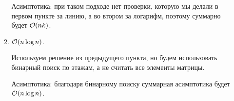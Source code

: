 \begin{enumerate}
\begin{enumerate}
\begin{solution}
            Асимптотика:
            при таком подходе нет проверки, которую мы делали в первом пункте за линию, а во втором за логарифм, поэтому суммарно будет $\mathcal{O}(nk)$.
        \end{solution}
        \item $\mathcal{O}(n \log{n})$.
        \begin{solution}
            Используем решение из предыдущего пункта, но будем использовать бинарный поиск по этажам, а не считать все элементы матрицы.

            Асимптотика:
            благодаря бинарному поиску суммарная асимптотика будет $\mathcal{O}(n\log n)$.
        \end{solution}
    \end{enumerate}
\end{enumerate}

